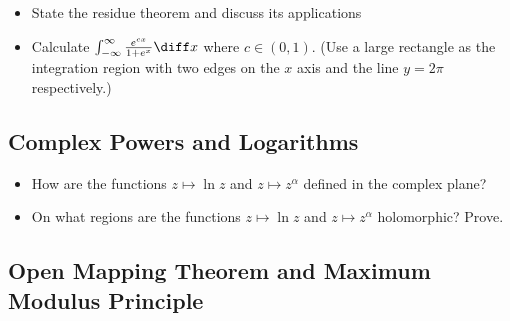 \begin{itemize}

	\item State the residue theorem and discuss its applications
	
	\item Calculate $ \int_{-\infty}^{\infty} \frac{e^{cx}}{1+e^{x}}\diff x $ where $ c \in (0, 1) $. (Use a large rectangle as the integration region with two edges on the $ x $ axis and the line $ y = 2\pi $ respectively.)

\end{itemize}

\subsection{Complex Powers and Logarithms}

\begin{itemize}

	\item How are the functions $ z \mapsto \ln z $ and $ z \mapsto z^{\alpha} $ defined in the complex plane?
	
	\item On what regions are the functions $ z \mapsto \ln z $ and $ z \mapsto z^{\alpha} $ holomorphic? Prove.

\end{itemize}

\subsection{Open Mapping Theorem and Maximum Modulus Principle}

